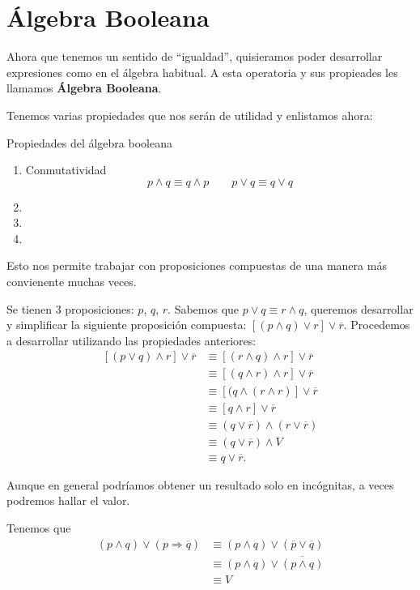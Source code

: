 \documentclass[12pt, twoside]{book}
\begin{document}
\section{Álgebra Booleana}
Ahora que tenemos un sentido de \enquote{igualdad}, quisieramos poder desarrollar expresiones como en el álgebra habitual. A esta operatoria y sus propieades les llamamos \textbf{Álgebra Booleana}.

Tenemos varias propiedades que nos serán de utilidad y enlistamos ahora:
\begin{thm}{Propiedades del álgebra booleana}
    \begin{enumerate}[label=\roman*.]
        \item Conmutatividad
            \[p\wedge q\equiv q\wedge p \qquad p\vee q \equiv q\vee q\]
        \item 
        \item 
        \item 
    \end{enumerate}
\end{thm}

Esto nos permite trabajar con proposiciones compuestas de una manera más convienente muchas veces.
\begin{example}
    Se tienen 3 proposiciones: \(p\), \(q\), \(r\). Sabemos que \(p\vee q \equiv r \wedge q\), queremos desarrollar y simplificar la siguiente proposición compuesta: \(\left[(p\wedge q)\vee r\right]\vee \overline{r}\). Procedemos a desarrollar utilizando las propiedades anteriores:
    \begin{align*}
        \left[(p\vee q)\wedge r\right]\vee \overline{r} & \equiv \left[(r\wedge q)\wedge r\right]\vee \overline{r} \\
                & \equiv \left[(q\wedge r)\wedge r\right]\vee \overline{r} \\
                & \equiv \left[(q\wedge (r\wedge r)\right]\vee \overline{r} \\
                & \equiv \left[q\wedge r\right]\vee\overline{r} \\
                & \equiv (q\vee\overline{r})\wedge(r\vee\overline{r}) \\
                & \equiv (q\vee\overline{r})\wedge V \\
                & \equiv q\vee\overline{r}.
    \end{align*}
\end{example}
Aunque en general podríamos obtener un resultado solo en incógnitas, a veces podremos hallar el valor.
\begin{example}
    Tenemos que
    \begin{align*}
        (p\wedge q)\vee(p\Rightarrow\overline{q})
        & \equiv (p\wedge q)\vee(\overline{p}\vee \overline{q}) \\
        & \equiv (p\wedge q)\vee \overline{\left(p\wedge q\right)} \\
        & \equiv V
    \end{align*}
\end{example}
\end{document}
